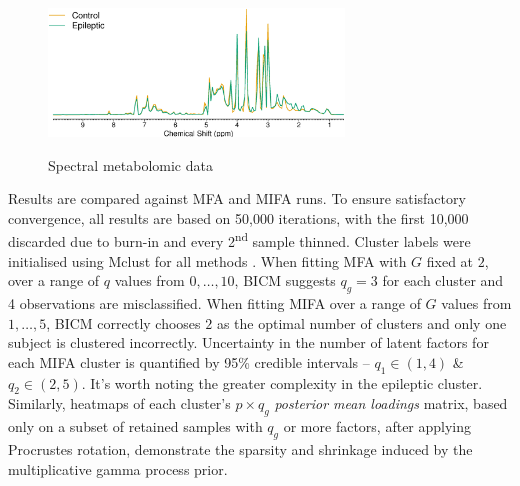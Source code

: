 \documentclass[a4paper,12pt,fleqn]{article}
\numberwithin{equation}{section}
\begin{document}
\begin{figure}[h]
	\centering
	\caption{Spectral metabolomic data}
	\includegraphics[width=0.7\textwidth, keepaspectratio]{Rat_Data.eps}
	\label{RatData}
\end{figure}

Results are compared against MFA and MIFA runs. To ensure satisfactory convergence, all results are based on 50,000 iterations, with the first 10,000 discarded due to burn-in and every 2\textsuperscript{nd} sample thinned. Cluster labels were initialised using Mclust for all methods \citep{Mclust}. When fitting MFA with $G$ fixed at $2$, over a range of $q$ values from $0,\ldots,10$, BICM suggests $q_g = 3$ for each cluster and 4 observations are misclassified. When fitting MIFA over a range of $G$ values from $1, \ldots, 5$, BICM correctly chooses $2$ as the optimal number of clusters and only one subject is clustered incorrectly. Uncertainty in the number of latent factors for each MIFA cluster is quantified by 95\% credible intervals -- $q_1 \in \left(1,4\right)$ \& $q_2 \in \left(2,5\right)$. It's worth noting the greater complexity in the epileptic cluster. Similarly, heatmaps of each cluster's $p\times q_g$ \textit{posterior mean loadings} matrix, based only on a subset of retained samples with $q_g$ or more factors, after applying Procrustes rotation, demonstrate the sparsity and shrinkage induced by the multiplicative gamma process prior.
\end{document}
